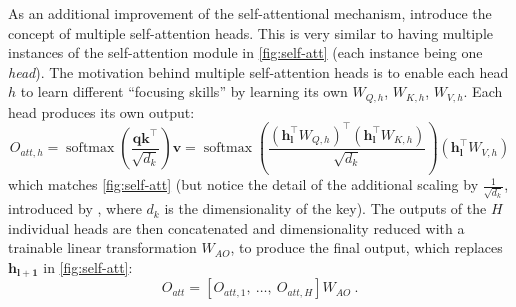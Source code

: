 \documentclass[bsc,frontabs,twoside,singlespacing,parskip,deptreport]{infthesis}
\DeclareMathOperator{\softmax}{softmax}
\begin{document}
{{{      %
      As an additional improvement of the self-attentional mechanism, \citeauthor{Vaswani_2017} introduce the concept of multiple self-attention heads. This is very similar to having multiple instances of the self-attention module in \autoref{fig:self-att} (each instance being one \textit{head}). The motivation behind multiple self-attention heads is to enable each head $h$ to learn different ``focusing skills'' by learning its own $W_{Q,h}$, $W_{K,h}$, $W_{V,h}$. Each head produces its own output:
      \begin{equation}
      O_{att,h} = \softmax(\frac{\bm{q}\bm{k^\top}}{\sqrt{d_k}})\bm{v} = \softmax(\frac{(\bm{h_l^\top}W_{Q,h})^\top(\bm{h_l^\top}W_{K,h})}{\sqrt{d_k}})(\bm{h_l^\top}W_{V,h})
      \end{equation}
      which matches \autoref{fig:self-att} (but notice the detail of the additional scaling by $\frac{1}{\sqrt{d_k}}$, introduced by \citeauthor{Vaswani_2017}, where $d_k$ is the dimensionality of the key).
      The outputs of the $H$ individual heads are then concatenated and dimensionality reduced with a trainable linear transformation $W_{AO}$, to produce the final output, which replaces $\bm{h_{l+1}}$ in \autoref{fig:self-att}:
      \begin{equation}
      O_{att} = [O_{att, 1},\ \ldots,\ O_{att, H}]W_{AO}\ .
      \end{equation}
      
}}}
\end{document}
